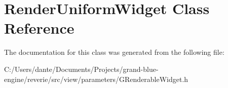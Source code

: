 \hypertarget{class_render_uniform_widget}{}\section{Render\+Uniform\+Widget Class Reference}
\label{class_render_uniform_widget}


The documentation for this class was generated from the following file\+:\begin{DoxyCompactItemize}
\item 
C\+:/\+Users/dante/\+Documents/\+Projects/grand-\/blue-\/engine/reverie/src/view/parameters/G\+Renderable\+Widget.\+h\end{DoxyCompactItemize}
